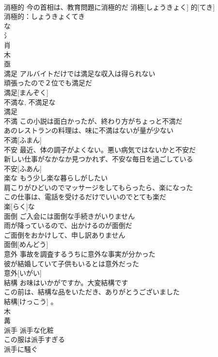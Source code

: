 \documentclass[8pt]{extreport}
\begin{document}
\begin{CJK}{UTF8}{min}
\\	消極的	今の首相は、教育問題に消極的だ	消極[しょうきょく] 的[てき]	
\\	消極的：しょうきょくてき
\\	な
\\	氵 
\\	肖 
\\	木 
\\	亟 
\\	満足	アルバイトだけでは満足な収入は得られない 
\\	頑張ったので２位でも満足だ 
\\	満足[まんぞく]			
\\	不満な, 不満足な 
\\	満足 
\\	不満	この小説は面白かったが、終わり方がちょっと不満だ 
\\	あのレストランの料理は、味に不満はないが量が少ない 
\\	不満[ふまん]			
\\	不安	最近、体の調子がよくない。悪い病気ではないかと不安だ 
\\	新しい仕事がなかなか見つかれず、不安な毎日を過ごしている 
\\	不安[ふあん]						
\\	楽な	もう少し楽な暮らしがしたい 
\\	肩こりがひどいのでマッサージをしてもらったら、楽になった 
\\	この仕事は、電話を受けるだけでいいのでとても楽だ 
\\	楽[らく]な						
\\	面倒	ご入会には面倒な手続きがいりません 
\\	雨が降っているので、出かけるのが面倒だ 
\\	ご面倒をおかけして、申し訳ありません 
\\	面倒[めんどう]			
\\	意外	事故を調査するうちに意外な事実が分かった 
\\	彼が結婚していて子供もいるとは意外だった 
\\	意外[いがい]			
\\	結構	お味はいかがですか。大変結構です 
\\	この前は、結構な品をいただき、ありがとうございました 
\\	結構[けっこう]		。	
\\	木 
\\	冓 
\\	派手	派手な化粧 
\\	この服は派手すぎる 
\\	派手に騒ぐ 

\end{CJK}
\end{document}
